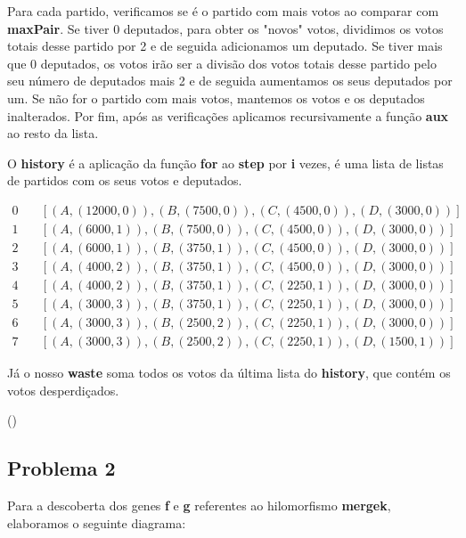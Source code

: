 \documentclass[11pt, a4paper, fleqn]{article}
\newcommand{\Varid}[1]{\mathit{#1}}
\def\resethooks{%
  \global\let\SaveRestoreHook\empty
  \global\let\ColumnHook\empty}
\let\hspre\empty
\let\hspost\empty
\begin{document}
Para cada partido, verificamos se é o partido com mais votos ao comparar com \textbf{maxPair}. 
Se tiver 0 deputados, para obter os "novos" votos, dividimos os votos totais desse partido por 2 e de seguida adicionamos um deputado. 
Se tiver mais que 0 deputados, os votos irão ser a divisão dos votos totais desse partido pelo seu número de deputados mais 2 e de seguida aumentamos os seus deputados por um.
Se não for o partido com mais votos, mantemos os votos e os deputados inalterados.
Por fim, após as verificações aplicamos recursivamente a função \textbf{aux} ao resto da lista.

\vspace{1em}\vspace{1em}

O \textbf{history} é a aplicação da função \textbf{for} ao \textbf{step} por \textbf{i} vezes, é uma lista de listas de partidos com os seus votos e deputados.


\begin{align*}
    0 & \quad [(A,(12000,0)),(B,(7500,0)),(C,(4500,0)),(D,(3000,0))] \\
    1 & \quad [(A,(6000,1)),(B,(7500,0)),(C,(4500,0)),(D,(3000,0))] \\
    2 & \quad [(A,(6000,1)),(B,(3750,1)),(C,(4500,0)),(D,(3000,0))] \\
    3 & \quad [(A,(4000,2)),(B,(3750,1)),(C,(4500,0)),(D,(3000,0))] \\
    4 & \quad [(A,(4000,2)),(B,(3750,1)),(C,(2250,1)),(D,(3000,0))] \\
    5 & \quad [(A,(3000,3)),(B,(3750,1)),(C,(2250,1)),(D,(3000,0))] \\
    6 & \quad [(A,(3000,3)),(B,(2500,2)),(C,(2250,1)),(D,(3000,0))] \\
    7 & \quad [(A,(3000,3)),(B,(2500,2)),(C,(2250,1)),(D,(1500,1))]
\end{align*}

Já o nosso \textbf{waste} soma todos os votos da última lista do \textbf{history}, que contém os votos desperdiçados. 

\begin{hscode}\SaveRestoreHook
\column{B}{@{}>{\hspre}l<{\hspost}@{}}%
\column{E}{@{}>{\hspre}l<{\hspost}@{}}%
\>[B]{}\Varid{waste}\mathrel{=}\Varid{sum}\comp \map \;(\comp {})\comp \Varid{last}{}\<[E]%
\ColumnHook
\end{hscode}\resethooks

\subsection*{Problema 2}
Para a descoberta dos genes \textbf{f} e \textbf{g} referentes ao hilomorfismo \textbf{mergek}, elaboramos o seguinte diagrama:
\end{document}

